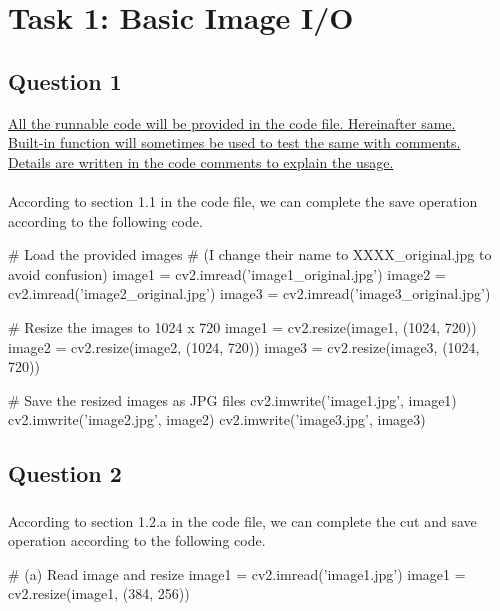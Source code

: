 \documentclass[12pt]{article}
\begin{document}
\thispagestyle{fancy}
\section{Task 1: Basic Image I/O}

\subsection{Question 1}
\underline{All the runnable code will be provided in the code file. Hereinafter same.}\\
\underline{Built-in function will sometimes be used to test the same with comments.}\\
\underline{Details are written in the code comments to explain the usage.}\\
\\
\quad According to section 1.1 in the code file, we can complete the save operation according to the following code.
\begin{python}
  # Load the provided images
  # (I change their name to XXXX_original.jpg to avoid confusion)
  image1 = cv2.imread('image1_original.jpg')
  image2 = cv2.imread('image2_original.jpg')
  image3 = cv2.imread('image3_original.jpg')

  # Resize the images to 1024 x 720
  image1 = cv2.resize(image1, (1024, 720))
  image2 = cv2.resize(image2, (1024, 720))
  image3 = cv2.resize(image3, (1024, 720))

  # Save the resized images as JPG files
  cv2.imwrite('image1.jpg', image1)
  cv2.imwrite('image2.jpg', image2)
  cv2.imwrite('image3.jpg', image3)
\end{python}

\subsection{Question 2}

\renewcommand{\thesubsubsection}{\thesubsection.\alph{subsubsection}}

\subsubsection{}
\quad According to section 1.2.a in the code file, we can complete the cut and save operation according to the following code.
\begin{python}
  # (a) Read image and resize
  image1 = cv2.imread('image1.jpg')
  image1 = cv2.resize(image1, (384, 256))
\end{python}
\end{document}
